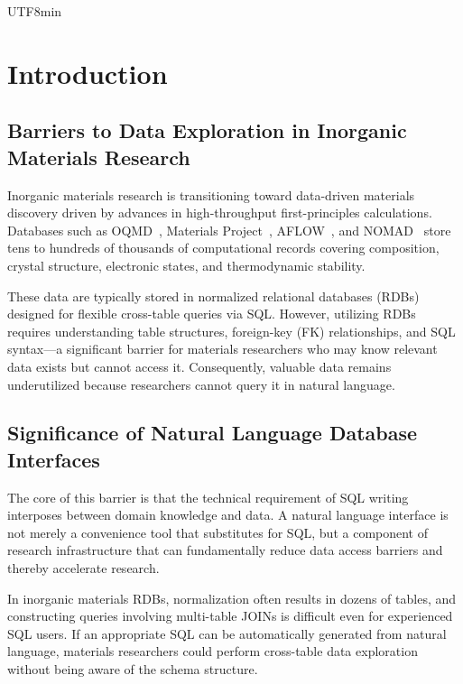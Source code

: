 \documentclass[sn-mathphys,Numbered]{sn-jnl}
\begin{document}
\maketitle

\begin{CJK}{UTF8}{min}
\section{Introduction}
\label{sec:introduction}

\subsection{Barriers to Data Exploration in Inorganic Materials Research}

Inorganic materials research is transitioning toward data-driven materials discovery
driven by advances in high-throughput first-principles calculations.
Databases such as
OQMD~\cite{saal2013oqmd,kirklin2015oqmd},
Materials Project~\cite{jain2013mp},
AFLOW~\cite{curtarolo2012aflow}, and
NOMAD~\cite{draxl2019nomad}
store tens to hundreds of thousands of computational records covering
composition, crystal structure, electronic states, and thermodynamic stability.

These data are typically stored in normalized relational databases (RDBs)
designed for flexible cross-table queries via SQL.
However, utilizing RDBs requires understanding table structures,
foreign-key (FK) relationships, and SQL syntax---a significant barrier for
materials researchers who may know relevant data exists
but cannot access it.
Consequently, valuable data remains underutilized because researchers
cannot query it in natural language.

\subsection{Significance of Natural Language Database Interfaces}

The core of this barrier is that the technical requirement of SQL writing
interposes between domain knowledge and data.
A natural language interface is not merely a convenience tool that substitutes for SQL,
but a component of research infrastructure that can fundamentally
reduce data access barriers and thereby accelerate research.

In inorganic materials RDBs, normalization often results in dozens of tables,
and constructing queries involving multi-table JOINs is difficult even for experienced SQL users.
If an appropriate SQL can be automatically generated from natural language,
materials researchers could perform cross-table data exploration
without being aware of the schema structure.


\end{CJK}
\end{document}
